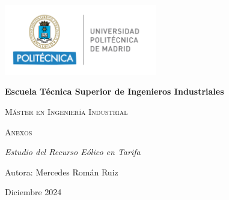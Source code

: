 \documentclass{IEEEtran}
\def\Fecha{Diciembre 2024}
\begin{document}
\printbibliography %

\newpage
\onecolumn

\thispagestyle{empty}
\begin{center}
    {\includegraphics[width=0.5\textwidth]{Imagenes/Logo UPM.png}\par}
    \vspace{1cm}
    {\bfseries\LARGE Escuela Técnica Superior de Ingenieros Industriales \par}
    \vspace{0.5cm}
    {\scshape\Large Máster en Ingeniería Industrial \par}
    \vspace{3cm}
    {\scshape\Huge Anexos \par}
    \vspace{1.5cm}
    {\itshape\Large Estudio del Recurso Eólico en Tarifa \par}
    \vfill
    {\Large Autora: Mercedes Román Ruiz \par}
    \vspace{0.5cm}
    {\Large \Fecha \par}
\end{center}

\newpage
\end{document}
